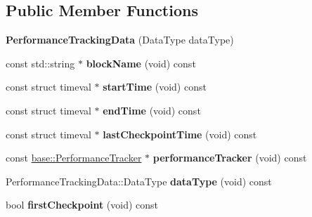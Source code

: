 \subsection*{Public Member Functions}
\begin{DoxyCompactItemize}
\item 
{\bfseries Performance\+Tracking\+Data} (Data\+Type data\+Type)\hypertarget{classel_1_1PerformanceTrackingData_afea4cb5328e6fdb27fcf8fc14acbdb40}{}\label{classel_1_1PerformanceTrackingData_afea4cb5328e6fdb27fcf8fc14acbdb40}

\item 
const std\+::string $\ast$ {\bfseries block\+Name} (void) const \hypertarget{classel_1_1PerformanceTrackingData_a929601137dcef83759a563a94ef7aad4}{}\label{classel_1_1PerformanceTrackingData_a929601137dcef83759a563a94ef7aad4}

\item 
const struct timeval $\ast$ {\bfseries start\+Time} (void) const \hypertarget{classel_1_1PerformanceTrackingData_aeb2462e8a5c9e43a874a5bd441f22a17}{}\label{classel_1_1PerformanceTrackingData_aeb2462e8a5c9e43a874a5bd441f22a17}

\item 
const struct timeval $\ast$ {\bfseries end\+Time} (void) const \hypertarget{classel_1_1PerformanceTrackingData_a1828f5f7c3c1d879b73bb090df87dfb8}{}\label{classel_1_1PerformanceTrackingData_a1828f5f7c3c1d879b73bb090df87dfb8}

\item 
const struct timeval $\ast$ {\bfseries last\+Checkpoint\+Time} (void) const \hypertarget{classel_1_1PerformanceTrackingData_af6f072db1ae54343864bc19c2f99c186}{}\label{classel_1_1PerformanceTrackingData_af6f072db1ae54343864bc19c2f99c186}

\item 
const \hyperlink{classel_1_1base_1_1PerformanceTracker}{base\+::\+Performance\+Tracker} $\ast$ {\bfseries performance\+Tracker} (void) const \hypertarget{classel_1_1PerformanceTrackingData_ad19493aa3f826fdee28b59630ba3ecae}{}\label{classel_1_1PerformanceTrackingData_ad19493aa3f826fdee28b59630ba3ecae}

\item 
Performance\+Tracking\+Data\+::\+Data\+Type {\bfseries data\+Type} (void) const \hypertarget{classel_1_1PerformanceTrackingData_a38dc15a2015be16e23aafd3c36332dbf}{}\label{classel_1_1PerformanceTrackingData_a38dc15a2015be16e23aafd3c36332dbf}

\item 
bool {\bfseries first\+Checkpoint} (void) const \hypertarget{classel_1_1PerformanceTrackingData_a5bf01d3c580627a9a564cc6043275287}{}\label{classel_1_1PerformanceTrackingData_a5bf01d3c580627a9a564cc6043275287}


\end{DoxyCompactItemize}
